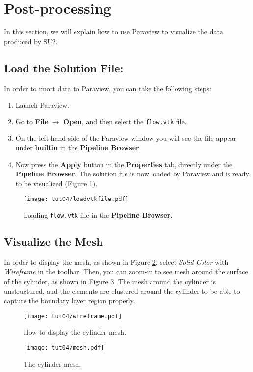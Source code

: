 \section*{Post-processing}
In this section, we will explain how to use Paraview to visualize the data produced by SU2.
\subsection{Load the Solution File:}
In order to imort data to Paraview, you can take the following steps:
\begin{enumerate}[label=\arabic*)]
	\setcounter{enumi}{0}
	\item Launch Paraview.
	\item Go to \textbf{File} $\rightarrow$ \textbf{Open}, and then select the \texttt{flow.vtk} file.
	\item On the left-hand side of the Paraview window you will see the file appear under \textbf{builtin} in the \textbf{Pipeline Browser}.
	\item Now press the \textbf{Apply} button in the \textbf{Properties} tab, directly under the \textbf{Pipeline Browser}. The solution file is now loaded by Paraview and is ready to be visualized (Figure \ref{fig4:load}).
\end{enumerate}
\begin{figure}[H]
    \centering
    \texttt{[image: tut04/loadvtkfile.pdf]}
    \caption{Loading \texttt{flow.vtk} file in the \textbf{Pipeline Browser}.}
    \label{fig4:load}
\end{figure}
\subsection{Visualize the Mesh}
In order to display the mesh, as shown in Figure \ref{fig4:wireframe_4}, select \textit{Solid Color} with \textit{Wireframe} in the toolbar. Then, you can zoom-in to see mesh around the surface of the cylinder, as shown in Figure \ref{fig4:mesh_4}. The mesh around the cylinder is unstructured, and the elements are clustered around the cylinder to be able to capture the boundary layer region properly.
\begin{figure}[ht]
    \centering
    \texttt{[image: tut04/wireframe.pdf]}
    \caption{How to display the cylinder mesh.}
    \label{fig4:wireframe_4}
\end{figure}
\begin{figure}[ht]
    \centering
    \texttt{[image: tut04/mesh.pdf]}
    \caption{The cylinder mesh.}
    \label{fig4:mesh_4}
\end{figure}
